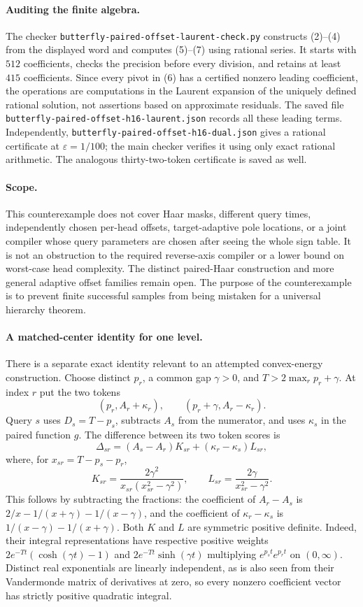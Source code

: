 \documentclass{article}
\begin{document}
\paragraph{Auditing the finite algebra.}
The checker \texttt{butterfly-paired-offset-laurent-check.py} constructs
(2)--(4) from the displayed word and computes (5)--(7) using rational
series.  It starts with $512$ coefficients, checks the precision before
every division, and retains at least $415$ coefficients.  Since every
pivot in (6) has a certified nonzero leading coefficient, the operations
are computations in the Laurent expansion of the uniquely defined
rational solution, not assertions based on approximate residuals.
The saved file \texttt{butterfly-paired-offset-h16-laurent.json} records
all these leading terms.  Independently,
\texttt{butterfly-paired-offset-h16-dual.json} gives a rational certificate
at $\varepsilon=1/100$; the main checker verifies it using only exact
rational arithmetic.  The analogous thirty-two-token certificate is
saved as well.

\paragraph{Scope.}
This counterexample does not cover Haar masks, different query times,
independently chosen per-head offsets, target-adaptive pole locations,
or a joint compiler whose query parameters are chosen after seeing the
whole sign table.  It is not an obstruction to the required reverse-axis
compiler or a lower bound on worst-case head complexity.  The distinct
paired-Haar construction and more general adaptive offset families remain
open.  The purpose of the counterexample is to prevent finite successful
samples from being mistaken for a universal hierarchy theorem.

\paragraph{A matched-center identity for one level.}
There is a separate exact identity relevant to an attempted convex-energy
construction. Choose distinct $p_r$, a common gap $\gamma>0$, and
$T>2\max_r p_r+\gamma$. At index $r$ put the two tokens
\[
 (p_r,A_r+\kappa_r),\qquad(p_r+\gamma,A_r-\kappa_r).
\]
Query $s$ uses $D_s=T-p_s$, subtracts $A_s$ from the numerator,
and uses $\kappa_s$ in the paired function $g$. The difference between
its two token scores is
\[
 \Delta_{sr}=(A_s-A_r)K_{sr}+(\kappa_r-\kappa_s)L_{sr},
\]
where, for $x_{sr}=T-p_s-p_r$,
\[
 K_{sr}=\frac{2\gamma^2}{x_{sr}(x_{sr}^2-\gamma^2)},
 \qquad L_{sr}=\frac{2\gamma}{x_{sr}^2-\gamma^2}.
\]
This follows by subtracting the fractions: the coefficient of $A_r-A_s$
is $2/x-1/(x+\gamma)-1/(x-\gamma)$, and the coefficient of
$\kappa_r-\kappa_s$ is $1/(x-\gamma)-1/(x+\gamma)$.
Both $K$ and $L$ are symmetric positive definite. Indeed, their integral
representations have respective positive weights
$2e^{-Tt}(\cosh(\gamma t)-1)$ and
$2e^{-Tt}\sinh(\gamma t)$ multiplying
$e^{p_st}e^{p_rt}$ on $(0,\infty)$. Distinct real exponentials are
linearly independent, as is also seen from their Vandermonde matrix of
derivatives at zero, so every nonzero coefficient vector has strictly
positive quadratic integral.
\end{document}
